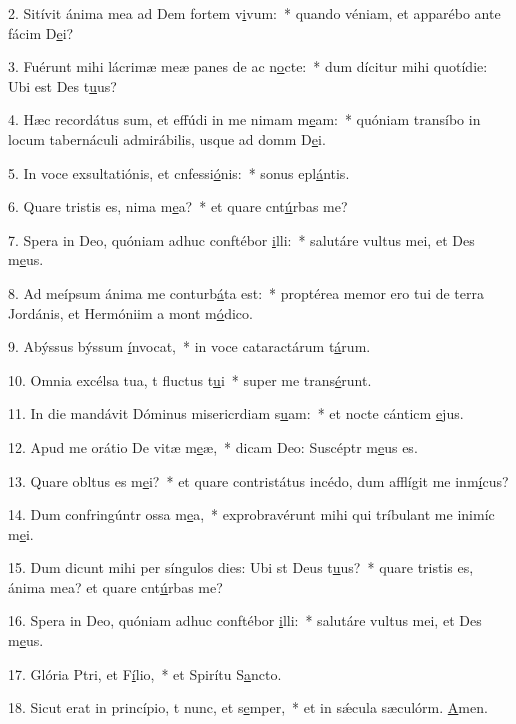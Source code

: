 2. Sitívit ánima mea ad Dem fortem v\uline{i}vum:~* quando véniam, et apparébo ante fácim D\uline{e}i?\par 
3. Fuérunt mihi lácrimæ meæ panes de ac n\uline{o}cte:~* dum dícitur mihi quotídie: Ubi est Des t\uline{u}us?\par 
4. Hæc recordátus sum, et effúdi in me nimam m\uline{e}am:~* quóniam transíbo in locum tabernáculi admirábilis, usque ad domm D\uline{e}i.\par 
5. In voce exsultatiónis, et cnfessi\uline{ó}nis:~* sonus epl\uline{á}ntis.\par 
6. Quare tristis es, nima m\uline{e}a?~* et quare cnt\uline{ú}rbas me?\par 
7. Spera in Deo, quóniam adhuc conftébor \uline{i}lli:~* salutáre vultus mei, et Des m\uline{e}us.\par 
8. Ad meípsum ánima me conturb\uline{á}ta est:~* proptérea memor ero tui de terra Jordánis, et Hermóniim a mont m\uline{ó}dico.\par 
9. Abýssus býssum \uline{í}nvocat,~* in voce cataractárum t\uline{á}rum.\par 
10. Omnia excélsa tua, t fluctus t\uline{u}i~* super me trans\uline{é}runt.\par 
11. In die mandávit Dóminus misericrdiam s\uline{u}am:~* et nocte cánticm \uline{e}jus.\par 
12. Apud me orátio De vitæ m\uline{e}æ,~* dicam Deo: Suscéptr m\uline{e}us es.\par 
13. Quare obltus es m\uline{e}i?~* et quare contristátus incédo, dum afflígit me inm\uline{í}cus?\par 
14. Dum confringúntr ossa m\uline{e}a,~* exprobravérunt mihi qui tríbulant me inimíc m\uline{e}i.\par 
15. Dum dicunt mihi per síngulos dies: Ubi st Deus t\uline{u}us?~* quare tristis es, ánima mea? et quare cnt\uline{ú}rbas me?\par 
16. Spera in Deo, quóniam adhuc conftébor \uline{i}lli:~* salutáre vultus mei, et Des m\uline{e}us.\par 
17. Glória Ptri, et F\uline{í}lio,~* et Spirítu S\uline{a}ncto.\par 
18. Sicut erat in princípio, t nunc, et s\uline{e}mper,~* et in sǽcula sæculórm. \uline{A}men.\par 

